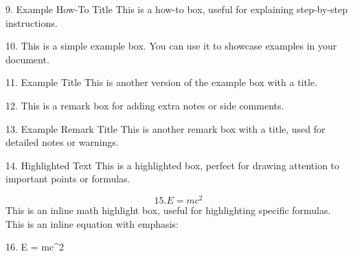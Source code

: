 \documentclass[a4paper,10pt]{article}
\begin{document}
\begin{KR}{9. Example How-To Title}
    This is a how-to box, useful for explaining step-by-step instructions.\\
\end{KR}

\begin{example}
    10. This is a simple example box. You can use it to showcase examples in your document.\\
\end{example}

\begin{example2}{11. Example Title}
    This is another version of the example box with a title.\\
\end{example2}

\begin{remark}
    12. This is a remark box for adding extra notes or side comments.\\
\end{remark}

\begin{remark2}{13. Example Remark Title}
    This is another remark box with a title, used for detailed notes or warnings.\\
\end{remark2}

\begin{highlight}{14. Highlighted Text}
    This is a highlighted box, perfect for drawing attention to important points or formulas.\\
\end{highlight}

\[
    15. E = mc^2
\]
This is an inline math highlight box, useful for highlighting specific formulas.\\

This is an inline equation with emphasis:
\begin{iequation}
    16. E = mc^2
\end{iequation}
\\
\end{document}
